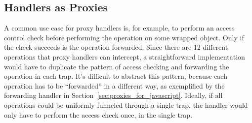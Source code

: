\documentclass{acm_proc_article-sp}
\begin{document}
%
%
%

\subsection{Handlers as Proxies}
\label{sub:doublelifting}

A common use case for proxy handlers is, for example, to perform an access control check before performing the operation on some wrapped object. Only if the check succeeds is the operation forwarded. Since there are 12 different operations that proxy handlers can intercept, a straightforward implementation would have to duplicate the pattern of access checking and forwarding the operation in each trap. It's difficult to abstract this pattern, because each operation has to be ``forwarded'' in a different way, as exemplified by the forwarding handler in Section~\ref{sec:proxies_for_javascript}. Ideally, if all operations could be uniformly funneled through a single trap, the handler would only have to perform the access check once, in the single trap.
\end{document}
